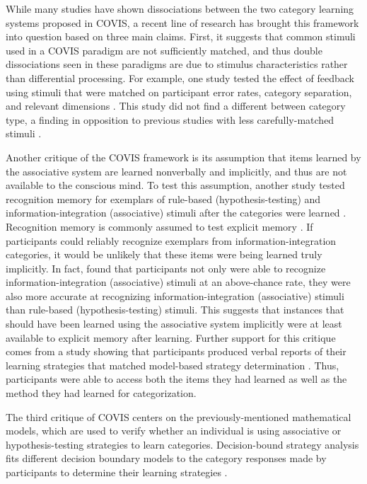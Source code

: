 \documentclass[../dissertation.tex]{subfiles}
\begin{document}
While many studies have shown dissociations between the two category learning systems proposed in COVIS, a recent line of research has brought this framework into question based on three main claims. First, it suggests that common stimuli used in a COVIS paradigm are not sufficiently matched, and thus double dissociations seen in these paradigms are due to stimulus characteristics rather than differential processing. For example, one study tested the effect of feedback using stimuli that were matched on participant error rates, category separation, and relevant dimensions \citep{Edmunds2015}. This study did not find a different between category type, a finding in opposition to previous studies with less carefully-matched stimuli \citep{Ashby2002, Maddox2003}. \par 
	Another critique of the COVIS framework is its assumption that items learned by the associative system are learned nonverbally and implicitly, and thus are not available to the conscious mind. To test this assumption, another study tested recognition memory for exemplars of rule-based (hypothesis-testing) and information-integration (associative) stimuli after the categories were learned \citep{Edmunds2016}. Recognition memory is commonly assumed to test explicit memory \citep{Gabrieli1995}. If participants could reliably recognize exemplars from information-integration categories, it would be unlikely that these items were being learned truly implicitly. In fact, \citet{Edmunds2016} found that participants not only were able to recognize information-integration (associative) stimuli at an above-chance rate, they were also more accurate at recognizing information-integration (associative) stimuli than rule-based (hypothesis-testing) stimuli. This suggests that instances that should have been learned using the associative system implicitly were at least available to explicit memory after learning. Further support for this critique comes from a study showing that participants produced verbal reports of their learning strategies that matched model-based strategy determination \cite{Edmunds2015}. Thus, participants were able to access both the items they had learned as well as the method they had learned for categorization.  \par 
	The third critique of COVIS centers on the previously-mentioned mathematical models, which are used to verify whether an individual is using associative or hypothesis-testing strategies to learn categories. Decision-bound strategy analysis fits different decision boundary models to the category responses made by participants to determine their learning strategies \citep{Maddox1993}. 
\end{document}
